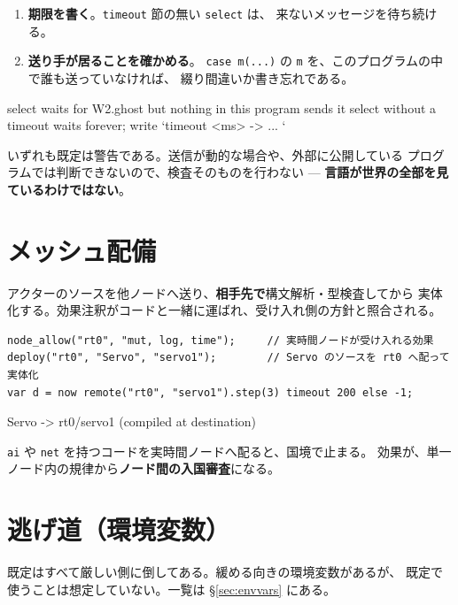 \documentclass[11pt,a4paper]{ltjsarticle}
\begin{document}
\begin{enumerate}
\item \textbf{期限を書く}。\texttt{timeout} 節の無い \texttt{select} は、
  来ないメッセージを待ち続ける。
\item \textbf{送り手が居ることを確かめる}。
  \texttt{case m(...)} の \texttt{m} を、このプログラムの中で誰も送っていなければ、
  綴り間違いか書き忘れである。
\end{enumerate}

\begin{term}
select waits for W2.ghost but nothing in this program sends it
select without a timeout waits forever; write `timeout <ms> -> { ... }`
\end{term}

いずれも既定は警告である。送信が動的な場合や、外部に公開している
プログラムでは判断できないので、検査そのものを行わない ---
\textbf{言語が世界の全部を見ているわけではない}。

\section{メッシュ配備}
\label{sec:mesh}

アクターのソースを他ノードへ送り、\textbf{相手先で}構文解析・型検査してから
実体化する。効果注釈がコードと一緒に運ばれ、受け入れ側の方針と照合される。

\begin{lstlisting}
node_allow("rt0", "mut, log, time");     // 実時間ノードが受け入れる効果
deploy("rt0", "Servo", "servo1");        // Servo のソースを rt0 へ配って実体化
var d = now remote("rt0", "servo1").step(3) timeout 200 else -1;
\end{lstlisting}

\begin{term}
[deploy] Servo -> rt0/servo1 (compiled at destination)
\end{term}

\texttt{ai} や \texttt{net} を持つコードを実時間ノードへ配ると、国境で止まる。
効果が、単一ノード内の規律から\textbf{ノード間の入国審査}になる。

\section{逃げ道（環境変数）}
\label{sec:escape}

既定はすべて厳しい側に倒してある。緩める向きの環境変数があるが、
既定で使うことは想定していない。一覧は \S\ref{sec:envvars} にある。
\end{document}
